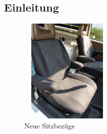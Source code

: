 ﻿%
% 
%



\subsection{Einleitung} 

\begin{figure} 
  \begin{centering}
    \includegraphics[width=0.4\textwidth, height=5cm, keepaspectratio]{../Bilder/Sylt/1.png}
    \caption{Neue Sitzbezüge}
  \end{centering}
\end{figure} 

